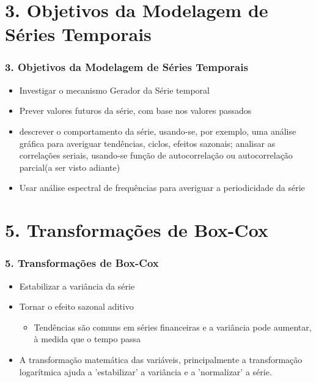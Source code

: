 \documentclass{beamer}
\begin{document}
	\section{3. Objetivos da Modelagem de Séries Temporais}
	\begin{frame}
		\frametitle{3. Objetivos da Modelagem de Séries Temporais}
		\begin{itemize}
			\item<1-> Investigar o mecanismo Gerador da Série temporal
			\item<1-> Prever valores futuros da série, com base nos valores passados
			\item<1-> descrever o comportamento da série, usando-se, por exemplo, uma análise gráfica para averiguar tendências, ciclos, efeitos sazonais; analisar as correlações seriais, usando-se função de autocorrelação ou autocorrelação parcial(a ser visto adiante)
			\item<1-> Usar análise espectral de frequências para averiguar a periodicidade da série
		\end{itemize}
	\end{frame}

	\section{5. Transformações de Box-Cox}
	\begin{frame}
		\frametitle{5. Transformações de Box-Cox}
			\begin{itemize}
			\item<1-> Estabilizar a variância da série 
			\item<1-> Tornar o efeito sazonal aditivo 
			\begin{itemize}
				\item<1-> Tendências são comuns em séries financeiras e a variância pode aumentar, à medida que o tempo passa
			\end{itemize}
			
			\item<1-> A transformação matemática das variáveis, principalmente a transformação logarítmica ajuda a 'estabilizar' a variância e a 'normalizar' a série.
		\end{itemize}
		
	\end{frame}
\end{document}
